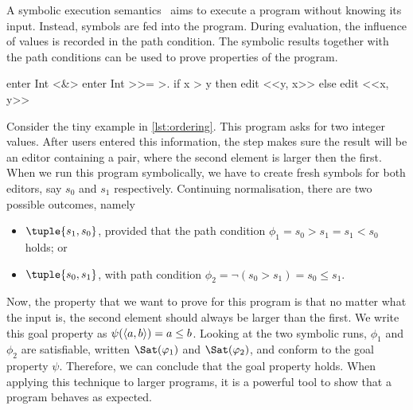 A symbolic execution semantics~\cite{King1975,Boyer1975} aims to execute a program without knowing its input.
Instead, symbols are fed into the program.
During evaluation, the influence of values is recorded in the path condition.
The symbolic results together with the path conditions can be used to prove properties of the program.

\begin{TASK}[
    float=ht,
    caption={Ordering of tuple elements.},
    captionpos=b,
    label=lst:ordering]
  enter Int <&> enter Int >>= >. if x > y then edit <<y, x>> else edit <<x, y>>
\end{TASK}

Consider the tiny example in \cref{lst:ordering}.
This program asks for two integer values.
After users entered this information, the step makes sure the result will be an editor containing a pair,
where the second element is larger then the first.
When we run this program symbolically, we have to create fresh symbols for both editors, say $s_0$ and $s_1$ respectively.
Continuing normalisation, there are two possible outcomes, namely
\begin{itemize}
  \item $\tuple{s_1,s_0}$, provided that the path condition $\phi_1 = s_0 > s_1 = s_1 < s_0$ holds; or
  \item $\tuple{s_0,s_1}$, with path condition $\phi_2 = \lnot (s_0 > s_1) = s_0 \leq s_1$.
\end{itemize}

Now, the property that we want to prove for this program is that no matter what the input is, the second element should always be larger than the first.
We write this goal property as $\psi(\langle a, b\rangle)= a \leq b$.
Looking at the two symbolic runs, $\phi_1$ and $\phi_2$ are satisfiable, written $\Sat(\phi_1)$ and $\Sat(\phi_2)$, and conform to the goal property $\psi$.
Therefore, we can conclude that the goal property holds.
%
When applying this technique to larger programs, it is a powerful tool to show that a program behaves as expected.


